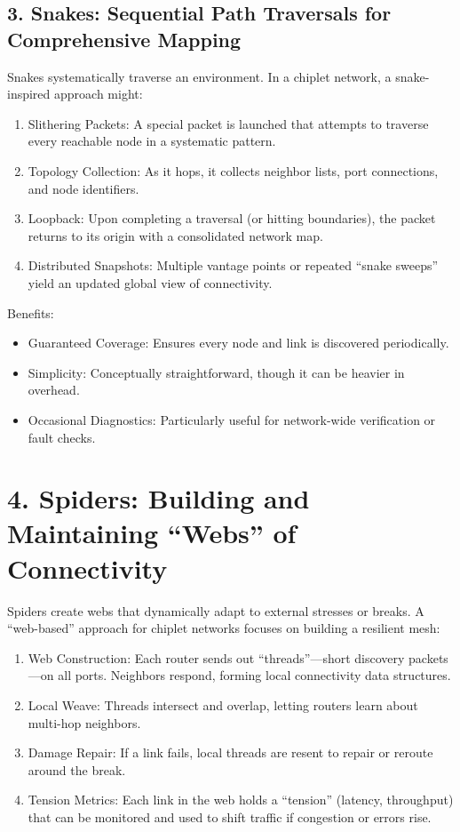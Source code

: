 \documentclass[../../../OAE-SPEC-MAIN.tex]{subfiles}
\begin{document}
\subsection{3. Snakes: Sequential Path Traversals for Comprehensive Mapping}

Snakes systematically traverse an environment. In a chiplet network, a snake-inspired approach might:
\begin{enumerate}
	\item  Slithering Packets: A special packet is launched that attempts to traverse every reachable node in a systematic pattern.
	\item  Topology Collection: As it hops, it collects neighbor lists, port connections, and node identifiers.
	\item  Loopback: Upon completing a traversal (or hitting boundaries), the packet returns to its origin with a consolidated network map.
	\item  Distributed Snapshots: Multiple vantage points or repeated “snake sweeps” yield an updated global view of connectivity.
\end{enumerate}


Benefits:
\begin{itemize}
	\item Guaranteed Coverage: Ensures every node and link is discovered periodically.
	\item Simplicity: Conceptually straightforward, though it can be heavier in overhead.
	\item Occasional Diagnostics: Particularly useful for network-wide verification or fault checks.
\end{itemize}

\section{4. Spiders: Building and Maintaining “Webs” of Connectivity}

Spiders create webs that dynamically adapt to external stresses or breaks. A “web-based” approach for chiplet networks focuses on building a resilient mesh:

\begin{enumerate}
	\item  	Web Construction: Each router sends out “threads”—short discovery packets—on all ports. Neighbors respond, forming local connectivity data structures.
	\item  	Local Weave: Threads intersect and overlap, letting routers learn about multi-hop neighbors.
	\item  	Damage Repair: If a link fails, local threads are resent to repair or reroute around the break.
	\item  Tension Metrics: Each link in the web holds a “tension” (latency, throughput) that can be monitored and used to shift traffic if congestion or errors rise.
\end{enumerate}
\end{document}

